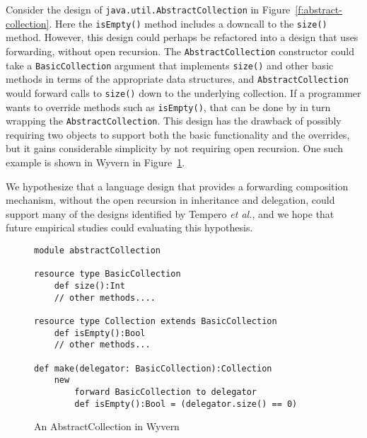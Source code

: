 \documentclass[preprint,10pt]{sigplanconf}
\begin{document}
Consider the design
of \texttt{java.util.AbstractCollection} in
Figure~\ref{f:abstract-collection}.  Here the \texttt{isEmpty()}
method includes a downcall to the \texttt{size()} method.
However, this design could perhaps be refactored into a design
that uses forwarding, without open recursion.  The
\texttt{AbstractCollection} constructor could take a
\texttt{BasicCollection} argument that implements \texttt{size()}
and other basic methods in terms of the appropriate data
structures, and \texttt{AbstractCollection} would forward calls
to \texttt{size()} down to the underlying collection.  If a
programmer wants to override methods such as \texttt{isEmpty()},
that can be done by in turn wrapping the \texttt{AbstractCollection}.
This design has the drawback of possibly requiring two objects to
support both the basic functionality and the overrides, but it gains
considerable simplicity by not requiring open recursion. One such example is shown in Wyvern in Figure~\ref{f:collection-wyvern}.

We
hypothesize that a language design that provides a forwarding
composition mechanism, without the open recursion in inheritance
and delegation, could support many of the designs identified by
Tempero \textit{et al.}, and we hope that future empirical studies
could evaluating this hypothesis.



\begin{figure}
\begin{lstlisting}
module abstractCollection

resource type BasicCollection
    def size():Int
    // other methods....

resource type Collection extends BasicCollection
    def isEmpty():Bool
    // other methods...

def make(delegator: BasicCollection):Collection
    new
        forward BasicCollection to delegator
        def isEmpty():Bool = (delegator.size() == 0)
\end{lstlisting}
\caption{An AbstractCollection in Wyvern}
\label{f:collection-wyvern}
\end{figure}
\end{document}
